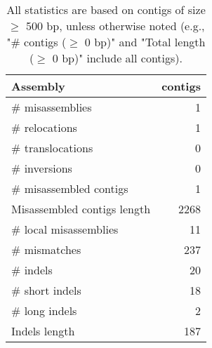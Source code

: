 \documentclass[12pt,a4paper]{article}
\begin{document}
\begin{table}[ht]
\begin{center}
\caption{All statistics are based on contigs of size $\geq$ 500 bp, unless otherwise noted (e.g., "\# contigs ($\geq$ 0 bp)" and "Total length ($\geq$ 0 bp)" include all contigs).}
\begin{tabular}{|l*{1}{|r}|}
\hline
Assembly & contigs \\ \hline
\# misassemblies & 1 \\ \hline
\hspace{5mm}\# relocations & 1 \\ \hline
\hspace{5mm}\# translocations & 0 \\ \hline
\hspace{5mm}\# inversions & 0 \\ \hline
\# misassembled contigs & 1 \\ \hline
Misassembled contigs length & 2268 \\ \hline
\# local misassemblies & 11 \\ \hline
\# mismatches & 237 \\ \hline
\# indels & 20 \\ \hline
\hspace{5mm}\# short indels & 18 \\ \hline
\hspace{5mm}\# long indels & 2 \\ \hline
Indels length & 187 \\ \hline
\end{tabular}
\end{center}
\end{table}
\end{document}
